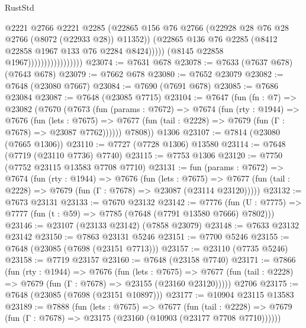 \begin{lexlean}{RustStd}
\begin{coremodule}
{\begin{coremodule}
{{{{{{{{{{{{{{{{{{{{{{{{{{{{{{{{{{{{{{{{{{{{{{{{{{{{{                                          @2221
                                          @2766
                                          @2221
                                          @2285
                                          (@22865
                                            @156
                                            @76
                                            @2766
                                            (@22928 @28 @76 @28 @2766 (@8072 (@22933 @28)) @11352))
                                          (@22865
                                            @136
                                            @76
                                            @2285
                                            (@8412 @22858 @1967 @133 @76 @2284 @8424)))))
                                    (@8145 @22858 @1967)))))))))))))))))
@23074 := @7631 @678
@23078 := @7633 (@7637 @678) (@7643 @678)
@23079 := @7662 @678
@23080 := @7652 @23079
@23082 := @7648 (@23080 @7667)
@23084 := @7690 (@7691 @678)
@23085 := @7686 @23084
@23087 := @7648 (@23085 @7715)
@23104 := @7647
    (fun (fn : @7) =>
    @23082
      (@7670
        (@7673
          (fun (params : @7672) =>
          @7674
            (fun (rty : @1944) =>
            @7676
              (fun (lets : @7675) =>
              @7677 (fun (tail : @2228) => @7679 (fun (Γ : @7678) => @23087 @7762))))))
        @7808))
    @1306
@23107 := @7814 (@23080 (@7665 @1306))
@23110 := @7727 (@7728 @1306) @13580
@23114 := @7648 (@7719 (@23110 @7736) @7740)
@23115 := @7753 @1306
@23120 := @7750 (@7752 @23115 @13583 @7708 @7710)
@23131 := fun (params : @7672) =>
  @7674
    (fun (rty : @1944) =>
    @7676
      (fun (lets : @7675) =>
      @7677 (fun (tail : @2228) => @7679 (fun (Γ : @7678) => @23087 (@23114 @23120)))))
@23132 := @7673 @23131
@23133 := @7670 @23132
@23142 := @7776
    (fun (U : @7775) => @7777 (fun (t : @59) => @7785 (@7648 (@7791 @13580 @7666) @7802)))
@23146 := @23107 (@23133 @23142) (@7858 @23079)
@23148 := @7633 @23132 @23142
@23150 := @7863 @23131 @5246
@23151 := @7700 @5246
@23155 := @7648 (@23085 (@7698 (@23151 @7713)))
@23157 := @23110 (@7735 @5246)
@23158 := @7719 @23157
@23160 := @7648 (@23158 @7740)
@23171 := @7866
    (fun (rty : @1944) =>
    @7676
      (fun (lets : @7675) =>
      @7677 (fun (tail : @2228) => @7679 (fun (Γ : @7678) => @23155 (@23160 @23120)))))
    @2706
@23175 := @7648 (@23085 (@7698 (@23151 @10897)))
@23177 := @10904 @23115 @13583
@23189 := @7888
    (fun (lets : @7675) =>
    @7677
      (fun (tail : @2228) =>
      @7679 (fun (Γ : @7678) => @23175 (@23160 (@10903 (@23177 @7708 @7710))))))
}}}}}}}}}}}}}}}}}}}}}}}}}}}}}}}}}}}}}}}}}}}}}}}}}}}}}
\end{coremodule}}
\end{coremodule}
\end{lexlean}

